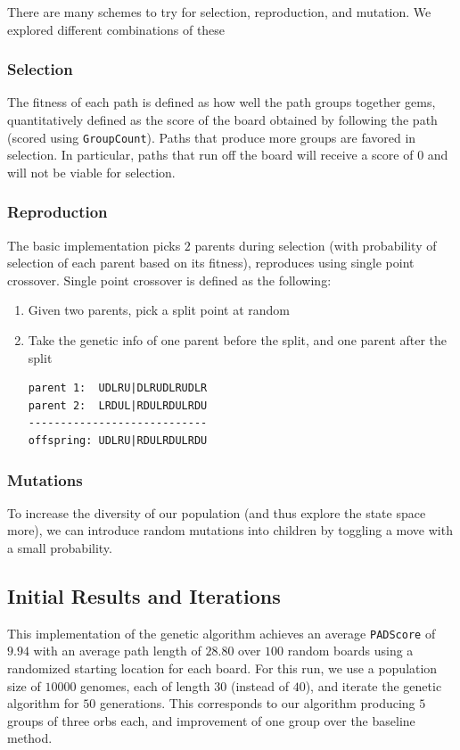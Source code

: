 \documentclass[journal,final,letterpaper,11pt]{IEEEtran}
\begin{document}
There are many schemes to try for selection, reproduction, and mutation. We explored different combinations of these
\subsubsection{Selection} 
The fitness of each path is defined as how well the path groups together gems, quantitatively defined as the score of the board obtained by following the path (scored using \texttt{GroupCount}). Paths that produce more groups are favored in selection. In particular, paths that run off the board will receive a score of $0$ and will not be viable for selection.
\subsubsection{Reproduction}
The basic implementation picks $2$ parents during selection (with probability of selection of each parent based on its fitness), reproduces using single point crossover. Single point crossover is defined as the following:
\begin{enumerate}[{i.}]
\item Given two parents, pick a split point at random
\item Take the genetic info of one parent before the split, and one parent after the split
\begin{verbatim}
parent 1:  UDLRU|DLRUDLRUDLR
parent 2:  LRDUL|RDULRDULRDU
----------------------------
offspring: UDLRU|RDULRDULRDU
\end{verbatim}
\end{enumerate}
\vspace*{0.1 in}
\subsubsection{Mutations}
To increase the diversity of our population (and thus explore the state space more), we can introduce random mutations into children by toggling a move with a small probability.

\subsection{Initial Results and Iterations}
This implementation of the genetic algorithm achieves an average \texttt{PADScore} of $9.94$ with an average path length of $28.80$ over $100$ random boards using a randomized starting location for each board. For this run, we use a population size of $10000$ genomes, each of length $30$ (instead of $40$), and iterate the genetic algorithm for $50$ generations.
This corresponds to our algorithm producing $5$ groups of three orbs each, and improvement of one group over the baseline method. 
\end{document}
